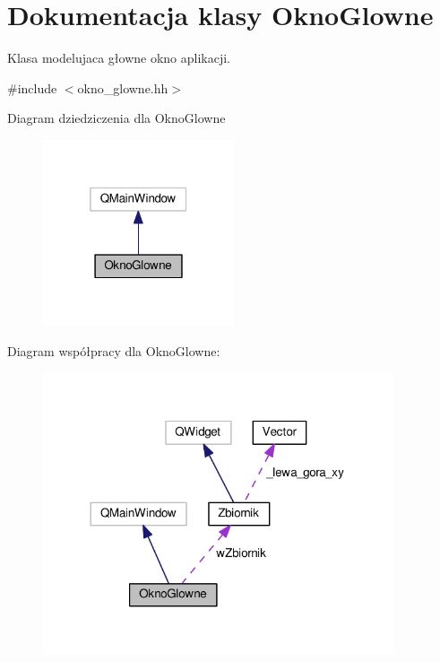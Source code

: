 \hypertarget{class_okno_glowne}{\section{Dokumentacja klasy Okno\-Glowne}
\label{class_okno_glowne}
}


Klasa modelujaca głowne okno aplikacji.  




{\ttfamily \#include $<$okno\-\_\-glowne.\-hh$>$}



Diagram dziedziczenia dla Okno\-Glowne\nopagebreak
\begin{figure}[H]
\begin{center}
\leavevmode
\includegraphics[width=160pt]{class_okno_glowne__inherit__graph}
\end{center}
\end{figure}


Diagram współpracy dla Okno\-Glowne\-:\nopagebreak
\begin{figure}[H]
\begin{center}
\leavevmode
\includegraphics[width=293pt]{class_okno_glowne__coll__graph}
\end{center}
\end{figure}
